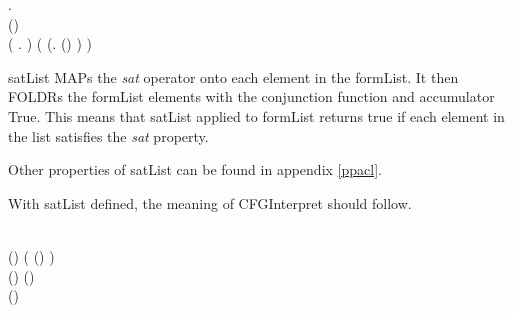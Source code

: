 \documentclass[../../main/main.tex]{subfiles}
\begin{document}
\begin{tabbing}
\parskip=8pt
\HOLTokenTurnstile{} \hspace{0.3cm}\HOLSymConst{\HOLTokenForall{}}   .\\
\hspace{0.5cm}(\HOLSymConst{,}\HOLSymConst{,})   \HOLSymConst{\HOLTokenEquiv{}} \\
\hspace{0.5cm}  (\HOLTokenLambda{} .  \HOLSymConst{\HOLTokenConj{}} )  ( (\HOLTokenLambda{}. (\HOLSymConst{,}\HOLSymConst{,})  ) )
\parskip=18pt
\end{tabbing}

satList MAPs the \textit{sat} operator onto each element in the formList. It then FOLDRs the formList elements with the conjunction function and accumulator True.  This means that satList applied to formList returns true if each element in the list satisfies the \textit{sat} property.

Other properties of satList can be found in appendix \ref{ppacl}.

With satList defined, the meaning of CFGInterpret should follow.  

\begin{tabbing}
\parskip=8pt
\HOLTokenTurnstile{} \\
\hspace{0.5cm}(\HOLSymConst{,}\HOLSymConst{,})
     (    (\HOLSymConst{::}) 
     ) \HOLSymConst{\HOLTokenEquiv{}} \\
\hspace{0.5cm}(\HOLSymConst{,}\HOLSymConst{,})    \HOLSymConst{\HOLTokenConj{}} (\HOLSymConst{,}\HOLSymConst{,})   \HOLSymConst{\HOLTokenConj{}}\\
\hspace{0.5cm}(\HOLSymConst{,}\HOLSymConst{,})    
\parskip=18pt
\end{tabbing}
\end{document}
